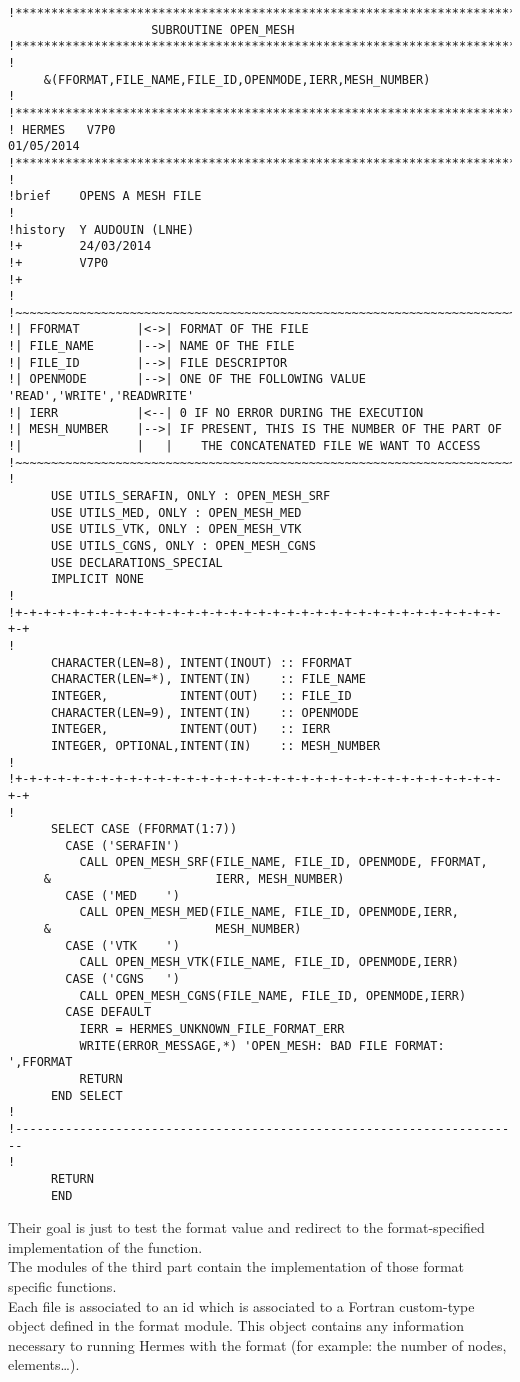 \begin{lstlisting}
!**********************************************************************
                    SUBROUTINE OPEN_MESH
!**********************************************************************
!
     &(FFORMAT,FILE_NAME,FILE_ID,OPENMODE,IERR,MESH_NUMBER)
!
!***********************************************************************
! HERMES   V7P0                                               01/05/2014
!***********************************************************************
!
!brief    OPENS A MESH FILE
!
!history  Y AUDOUIN (LNHE)
!+        24/03/2014
!+        V7P0
!+
!
!~~~~~~~~~~~~~~~~~~~~~~~~~~~~~~~~~~~~~~~~~~~~~~~~~~~~~~~~~~~~~~~~~~~~~~~
!| FFORMAT        |<->| FORMAT OF THE FILE
!| FILE_NAME      |-->| NAME OF THE FILE
!| FILE_ID        |-->| FILE DESCRIPTOR
!| OPENMODE       |-->| ONE OF THE FOLLOWING VALUE 'READ','WRITE','READWRITE'
!| IERR           |<--| 0 IF NO ERROR DURING THE EXECUTION
!| MESH_NUMBER    |-->| IF PRESENT, THIS IS THE NUMBER OF THE PART OF
!|                |   |    THE CONCATENATED FILE WE WANT TO ACCESS
!~~~~~~~~~~~~~~~~~~~~~~~~~~~~~~~~~~~~~~~~~~~~~~~~~~~~~~~~~~~~~~~~~~~~~~~
!
      USE UTILS_SERAFIN, ONLY : OPEN_MESH_SRF
      USE UTILS_MED, ONLY : OPEN_MESH_MED
      USE UTILS_VTK, ONLY : OPEN_MESH_VTK
      USE UTILS_CGNS, ONLY : OPEN_MESH_CGNS
      USE DECLARATIONS_SPECIAL
      IMPLICIT NONE
!
!+-+-+-+-+-+-+-+-+-+-+-+-+-+-+-+-+-+-+-+-+-+-+-+-+-+-+-+-+-+-+-+-+-+-+-+
!
      CHARACTER(LEN=8), INTENT(INOUT) :: FFORMAT
      CHARACTER(LEN=*), INTENT(IN)    :: FILE_NAME
      INTEGER,          INTENT(OUT)   :: FILE_ID
      CHARACTER(LEN=9), INTENT(IN)    :: OPENMODE
      INTEGER,          INTENT(OUT)   :: IERR
      INTEGER, OPTIONAL,INTENT(IN)    :: MESH_NUMBER
!
!+-+-+-+-+-+-+-+-+-+-+-+-+-+-+-+-+-+-+-+-+-+-+-+-+-+-+-+-+-+-+-+-+-+-+-+
!
      SELECT CASE (FFORMAT(1:7))
        CASE ('SERAFIN')
          CALL OPEN_MESH_SRF(FILE_NAME, FILE_ID, OPENMODE, FFORMAT,
     &                       IERR, MESH_NUMBER)
        CASE ('MED    ')
          CALL OPEN_MESH_MED(FILE_NAME, FILE_ID, OPENMODE,IERR,
     &                       MESH_NUMBER)
        CASE ('VTK    ')
          CALL OPEN_MESH_VTK(FILE_NAME, FILE_ID, OPENMODE,IERR)
        CASE ('CGNS   ')
          CALL OPEN_MESH_CGNS(FILE_NAME, FILE_ID, OPENMODE,IERR)
        CASE DEFAULT
          IERR = HERMES_UNKNOWN_FILE_FORMAT_ERR
          WRITE(ERROR_MESSAGE,*) 'OPEN_MESH: BAD FILE FORMAT: ',FFORMAT
          RETURN
      END SELECT
!
!-----------------------------------------------------------------------
!
      RETURN
      END
\end{lstlisting}
%
Their goal is just to test the format value and redirect to the
format-specified implementation of the function.\\
%
The modules of the third part contain the implementation of those format
specific functions.\\
%
Each file is associated to an id which is associated to a Fortran custom-type
object defined in the format module. This object contains any information
necessary to running Hermes with the format (for example: the number of nodes,
elements\ldots).



